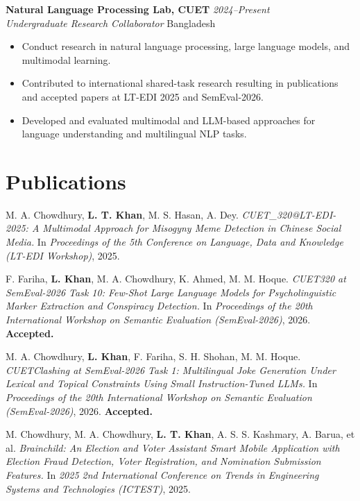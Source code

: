 \documentclass[a4paper,11pt]{article}
\newcommand{\entry}[4]{
  \textbf{#1} \hfill \textit{#4}\\
  \textit{#2} \hfill #3\\[-0.25em]
}
\begin{document}
\entry
{Natural Language Processing Lab, CUET}
{Undergraduate Research Collaborator}
{Bangladesh}
{2024--Present}

\begin{itemize}
    \item Conduct research in natural language processing, large language
    models, and multimodal learning.
    \item Contributed to international shared-task research resulting in
    publications and accepted papers at LT-EDI 2025 and SemEval-2026.
    \item Developed and evaluated multimodal and LLM-based approaches for
    language understanding and multilingual NLP tasks.
\end{itemize}

\section*{Publications}

\begin{enumerate}[leftmargin=1.65em,label={[\arabic*]},itemsep=5pt]

\item M. A. Chowdhury, \textbf{L. T. Khan}, M. S. Hasan, A. Dey.
\textit{CUET\_320@LT-EDI-2025: A Multimodal Approach for Misogyny Meme
Detection in Chinese Social Media.}
In \textit{Proceedings of the 5th Conference on Language, Data and
Knowledge (LT-EDI Workshop)}, 2025.

\item F. Fariha, \textbf{L. Khan}, M. A. Chowdhury, K. Ahmed, M. M. Hoque.
\textit{CUET320 at SemEval-2026 Task 10: Few-Shot Large Language Models
for Psycholinguistic Marker Extraction and Conspiracy Detection.}
In \textit{Proceedings of the 20th International Workshop on Semantic
Evaluation (SemEval-2026)}, 2026. \textbf{Accepted.}

\item M. A. Chowdhury, \textbf{L. Khan}, F. Fariha, S. H. Shohan,
M. M. Hoque.
\textit{CUETClashing at SemEval-2026 Task 1: Multilingual Joke Generation
Under Lexical and Topical Constraints Using Small Instruction-Tuned LLMs.}
In \textit{Proceedings of the 20th International Workshop on Semantic
Evaluation (SemEval-2026)}, 2026. \textbf{Accepted.}

\item M. Chowdhury, M. A. Chowdhury, \textbf{L. T. Khan},
A. S. S. Kashmary, A. Barua, et al.
\textit{Brainchild: An Election and Voter Assistant Smart Mobile Application
with Election Fraud Detection, Voter Registration, and Nomination Submission
Features.}
In \textit{2025 2nd International Conference on Trends in Engineering
Systems and Technologies (ICTEST)}, 2025.

\end{enumerate}
\end{document}
